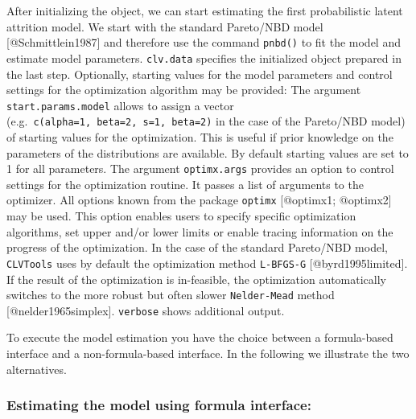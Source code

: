 \documentclass[
]{article}
\begin{document}
After initializing the object, we can start estimating the first
probabilistic latent attrition model. We start with the standard
Pareto/NBD model {[}@Schmittlein1987{]} and therefore use the command
\texttt{pnbd()} to fit the model and estimate model parameters.
\texttt{clv.data} specifies the initialized object prepared in the last
step. Optionally, starting values for the model parameters and control
settings for the optimization algorithm may be provided: The argument
\texttt{start.params.model} allows to assign a vector
(e.g.~\texttt{c(alpha=1,\ beta=2,\ s=1,\ beta=2)} in the case of the
Pareto/NBD model) of starting values for the optimization. This is
useful if prior knowledge on the parameters of the distributions are
available. By default starting values are set to 1 for all parameters.
The argument \texttt{optimx.args} provides an option to control settings
for the optimization routine. It passes a list of arguments to the
optimizer. All options known from the package \texttt{optimx}
{[}@optimx1; @optimx2{]} may be used. This option enables users to
specify specific optimization algorithms, set upper and/or lower limits
or enable tracing information on the progress of the optimization. In
the case of the standard Pareto/NBD model, \texttt{CLVTools} uses by
default the optimization method \texttt{L-BFGS-G}
{[}@byrd1995limited{]}. If the result of the optimization is
in-feasible, the optimization automatically switches to the more robust
but often slower \texttt{Nelder-Mead} method {[}@nelder1965simplex{]}.
\texttt{verbose} shows additional output.

To execute the model estimation you have the choice between a
formula-based interface and a non-formula-based interface. In the
following we illustrate the two alternatives.

\subsubsection{\texorpdfstring{\textbf{Estimating the model using
formula
interface:}}{Estimating the model using formula interface:}}\label{estimating-the-model-using-formula-interface}
\end{document}
